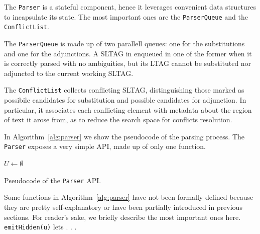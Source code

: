 The \texttt{Parser} is a stateful component, hence it leverages convenient data structures to incapsulate its state.
%
The most important ones are the \texttt{ParserQueue} and the \texttt{ConflictList}.

The \texttt{ParserQueue} is made up of two parallell queues: one for the substitutions and one for the adjunctions. A SLTAG in enqueued in one of the former when it is correctly parsed with no ambiguities, but its LTAG cannot be substituted nor adjuncted to the current working SLTAG.

The \texttt{ConflictList} collects conflicting SLTAG, distinguishing those marked as possibile candidates for substitution and possible candidates for adjunction. In particular, it associates each conflicting element with metadata about the region of text it arose from, as to reduce the search space for conflicts resolution.

In Algorithm~\ref{alg:parser} we show the pseudocode of the parsing process.
%
The \texttt{Parser} exposes a very simple API, made up of only one function.

\begin{algorithm}[t]

 {
	$U \leftarrow \emptyset$ \\
}
\caption{Pseudocode of the \texttt{Parser} API.}
\label{alg:parser}
\end{algorithm}

Some functions in Algorithm~\ref{alg:parser} have not been formally defined because they are pretty self-explanatory or have been partially introduced in previous sections.
%
For reader's sake, we briefly describe the most important ones here.
%
\texttt{emitHidden(u)} lets . . .
